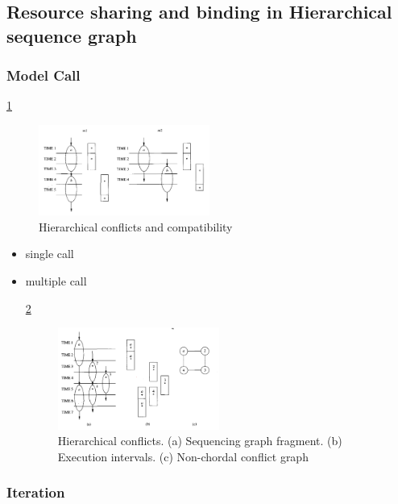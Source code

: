 \subsection{Resource sharing and binding in Hierarchical sequence graph}


\subsubsection{Model Call}
\ref{fig:Hierarchical_conflicts_and_compatibility}
\begin{figure}[h]
    \centering
    \includegraphics[width=0.5\textwidth]{Hierarchical_conflicts_and_compatibility}
    \caption{ Hierarchical conflicts and compatibility \cite{b1}}
    \label{fig:Hierarchical_conflicts_and_compatibility}
\end{figure}


\begin{itemize}
\item single call
\item multiple call

\ref{fig:Hierarchical_conflicts}
\begin{figure}[h]
    \centering
    \includegraphics[width=0.5\textwidth]{Hierarchical_conflicts}
    \caption{ Hierarchical conflicts. (a) Sequencing graph fragment. (b) Execution intervals. (c) Non-chordal conflict 
graph \cite{b1}}
    \label{fig:Hierarchical_conflicts}
\end{figure}
\end{itemize}


\subsubsection{Iteration}

